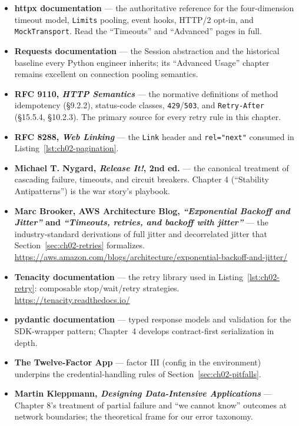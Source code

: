 \begin{itemize}
  \item \textbf{httpx documentation} \cite{httpxdocs} --- the authoritative
        reference for the four-dimension timeout model, \texttt{Limits}
        pooling, event hooks, HTTP/2 opt-in, and \texttt{MockTransport}.
        Read the ``Timeouts'' and ``Advanced'' pages in full.
  \item \textbf{Requests documentation} \cite{requestsdocs} --- the Session
        abstraction and the historical baseline every Python engineer
        inherits; its ``Advanced Usage'' chapter remains excellent on
        connection pooling semantics.
  \item \textbf{RFC 9110, \emph{HTTP Semantics}} \cite{rfc9110} --- the
        normative definitions of method idempotency (\S9.2.2), status-code
        classes, \texttt{429}/\texttt{503}, and \texttt{Retry-After}
        (\S15.5.4, \S10.2.3). The primary source for every retry rule in
        this chapter.
  \item \textbf{RFC 8288, \emph{Web Linking}} --- the \texttt{Link} header
        and \texttt{rel="next"} consumed in
        Listing~\ref{lst:ch02-pagination}.
  \item \textbf{Michael T. Nygard, \emph{Release It!}, 2nd ed.}
        \cite{nygard2018releaseit} --- the canonical treatment of cascading
        failure, timeouts, and circuit breakers. Chapter 4 (``Stability
        Antipatterns'') is the war story's playbook.
  \item \textbf{Marc Brooker, AWS Architecture Blog, \emph{``Exponential
        Backoff and Jitter''} and \emph{``Timeouts, retries, and backoff
        with jitter''}} --- the industry-standard derivations of full jitter
        and decorrelated jitter that Section~\ref{sec:ch02-retries}
        formalizes. \url{https://aws.amazon.com/blogs/architecture/exponential-backoff-and-jitter/}
  \item \textbf{Tenacity documentation} --- the retry library used in
        Listing~\ref{lst:ch02-retry}: composable stop/wait/retry strategies.
        \url{https://tenacity.readthedocs.io/}
  \item \textbf{pydantic documentation} \cite{pydanticdocs} --- typed
        response models and validation for the SDK-wrapper pattern; Chapter~4
        develops contract-first serialization in depth.
  \item \textbf{The Twelve-Factor App} \cite{twelvefactor} --- factor III
        (config in the environment) underpins the credential-handling rules
        of Section~\ref{sec:ch02-pitfalls}.
  \item \textbf{Martin Kleppmann, \emph{Designing Data-Intensive
        Applications}} \cite{kleppmann2017ddia} --- Chapter 8's treatment of
        partial failure and ``we cannot know'' outcomes at network
        boundaries; the theoretical frame for our error taxonomy.
\end{itemize}

